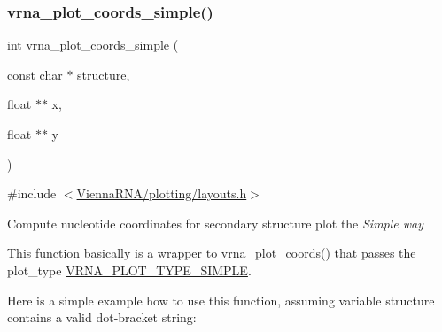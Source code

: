 \subsubsection{\texorpdfstring{vrna\_plot\_coords\_simple()}{vrna\_plot\_coords\_simple()}}
{\footnotesize\ttfamily int vrna\+\_\+plot\+\_\+coords\+\_\+simple (\begin{DoxyParamCaption}\item[{const char $\ast$}]{structure,  }\item[{float $\ast$$\ast$}]{x,  }\item[{float $\ast$$\ast$}]{y }\end{DoxyParamCaption})}



{\ttfamily \#include $<$\mbox{\hyperlink{layouts_8h}{Vienna\+R\+N\+A/plotting/layouts.\+h}}$>$}



Compute nucleotide coordinates for secondary structure plot the {\itshape Simple way} 

This function basically is a wrapper to \mbox{\hyperlink{group__plot__layout__utils_ga2e2adbef0283a8ff2dfe5284eb1f4a6a}{vrna\+\_\+plot\+\_\+coords()}} that passes the {\ttfamily plot\+\_\+type} \mbox{\hyperlink{group__plot__layout__utils_gae6d17b9f0a53cf5205a9181e0f8422e9}{V\+R\+N\+A\+\_\+\+P\+L\+O\+T\+\_\+\+T\+Y\+P\+E\+\_\+\+S\+I\+M\+P\+LE}}.

Here is a simple example how to use this function, assuming variable {\ttfamily structure} contains a valid dot-\/bracket string\+: 
\begin{DoxyCode}{0}
\DoxyCodeLine{}
\DoxyCodeLine{\} \textcolor{keywordflow}{else} \{}
\DoxyCodeLine{\}}
\DoxyCodeLine{}
\end{DoxyCode}


